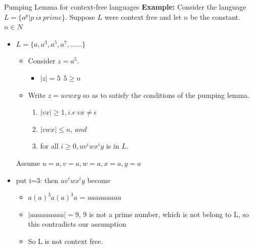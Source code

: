 \documentclass{beamer}
\begin{document}
\begin{frame}{Pumping Lemma for context-free languages}
	\textbf{Example:}
	Consider the language $L = \{a^p | p\ is\ prime\}$. Suppose $L$ were context free and let 
	$n$ be the constant. $n \in N$
	\begin{itemize}
		\item $L=\{a,a^3,a^5,a^7,......\}$
		\begin{itemize}
			\item Consider $z = a^5.$ 
			\begin{itemize}
				\item $\big |z \big | =5\ \ 5\geq n$
			\end{itemize}
			\item Write $z = uvwxy$ so as to satisfy the conditions of the pumping lemma.
			\begin{enumerate}
				\item $|vx| \geq 1,i.e\ vx \neq \epsilon$
				\item $|vwx|\leq n, \ and$
				\item for all $i\geq 0, uv^iwx^iy$ is in $L$.
			\end{enumerate}
		\end{itemize}
		Assume $u=a,v=a,w=a,x=a,y=a$ 
	\item	put i=3: then $uv^iwx^iy$ become
	\begin{itemize}
		\item $a(a)^3a(a)^3a$ = $aaaaaaaaa$
		\item   $ \big | aaaaaaaaa \big | =9$, 9 is not a prime number, which is not belong to L, so this contradicts our assumption
		\item So L is not context free.
	\end{itemize}
	\end{itemize}
\end{frame}

		
\end{document}
